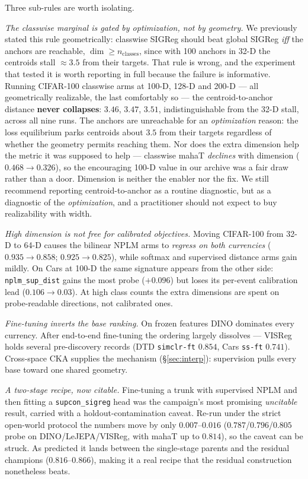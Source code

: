 \documentclass{article}
\begin{document}
Three sub-rules are worth isolating.

\emph{The classwise marginal is gated by optimization, not by geometry.} We
previously stated this rule geometrically: classwise SIGReg should beat global
SIGReg \emph{iff} the anchors are reachable, $\dim \geq n_{\text{classes}}$,
since with 100 anchors in 32-D the centroids stall $\approx3.5$ from their
targets. That rule is wrong, and the experiment that tested it is worth
reporting in full because the failure is informative. Running CIFAR-100
classwise arms at 100-D, 128-D and 200-D --- all geometrically realizable, the
last comfortably so --- the centroid-to-anchor distance \textbf{never
collapses}: $3.46$, $3.47$, $3.51$, indistinguishable from the 32-D stall,
across all nine runs. The anchors are unreachable for an \emph{optimization}
reason: the loss equilibrium parks centroids about $3.5$ from their targets
regardless of whether the geometry permits reaching them. Nor does the extra
dimension help the metric it was supposed to help --- classwise mahaT
\emph{declines} with dimension ($0.468 \to 0.326$), so the encouraging 100-D
value in our archive was a fair draw rather than a door. Dimension is neither
the enabler nor the fix. We still recommend reporting centroid-to-anchor as a
routine diagnostic, but as a diagnostic of the \emph{optimization}, and a
practitioner should not expect to buy realizability with width.

\emph{High dimension is not free for calibrated objectives.} Moving CIFAR-100
from 32-D to 64-D causes the bilinear NPLM arms to \emph{regress on both
currencies} ($0.935\to0.858$; $0.925\to0.825$), while softmax and supervised
distance arms gain mildly. On Cars at 100-D the same signature appears from the
other side: \texttt{nplm\_sup\_dist} gains the most probe ($+0.096$) but loses
its per-event calibration lead ($0.106\to0.03$). At high class counts the extra
dimensions are spent on probe-readable directions, not calibrated ones.

\emph{Fine-tuning inverts the base ranking.} On frozen features DINO dominates
every currency. After end-to-end fine-tuning the ordering largely dissolves ---
VISReg holds several pre-discovery records (DTD \texttt{simclr-ft} $0.854$,
Cars \texttt{ss-ft} $0.741$). Cross-space CKA supplies the mechanism
(\S\ref{sec:interp}): supervision pulls every base toward one shared geometry.

\emph{A two-stage recipe, now citable.} Fine-tuning a trunk with supervised
NPLM and then fitting a \texttt{supcon\_sigreg} head was the campaign's most
promising \emph{uncitable} result, carried with a holdout-contamination
caveat. Re-run under the strict open-world protocol the numbers move by only
$0.007$--$0.016$ ($0.787$/$0.796$/$0.805$ probe on DINO/LeJEPA/VISReg, with
mahaT up to $0.814$), so the caveat can be struck. As predicted it lands
between the single-stage parents and the residual champions
($0.816$--$0.866$), making it a real recipe that the residual construction
nonetheless beats.
\end{document}
